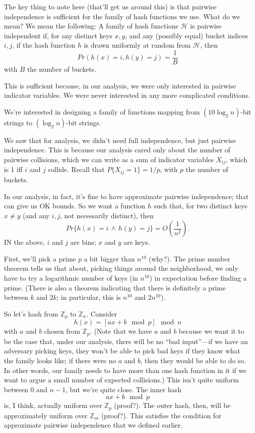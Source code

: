 \documentclass{article}
\newcommand{\Z}{\mathbb{Z}}
\begin{document}
The key thing to note here (that'll get us around this) is that pairwise 
independence is sufficient
for the family of hash functions we use.
What do we mean?
We mean the following:
A family of hash functions $\mathcal H$ is pairwise independent if,
for any distinct keys $x,y$, and any (possibly equal) bucket
indices $i,j$, if the hash function $h$ is drawn uniformly at random
from $\mathcal H$,
then
$$
Pr(h(x) = i, h(y) = j)
=
\frac{1}{B}
$$
with $B$ the number of buckets.

This is sufficient because, in our analysis, we were only interested in
pairwise indicator variables. 
We were never interested in any more complicated conditions.



We're interested in designing a family of functions mapping from
$(10 \log_2 n)$-bit strings to $(\log_2 n)$-bit strings.

We saw that for analysis, we didn't need full independence, but just
pairwise independence.
This is because our analysis cared only about the number of pairwise collisions,
which we can write as a sum of indicator variables $X_{ij}$, which is
1 iff $i$ and $j$ collide.
Recall that $P\{X_{ij} = 1\} = 1/p$, with $p$ the number of buckets.

In our analysis, in fact, it's fine to have approximate pairwise independence;
that can give us OK bounds.
So we want a function $h$ such that, for two distinct keys $x\neq y$ (and any $i,j$, not necessarily distinct),
then
$$
Pr\{
	h(x) = i \,\wedge\,
	h(y) = j
\}
=
O\left(
	\frac{1}{n^2}
\right).
$$
IN the above, $i$ and $j$ are bins; $x$ and $y$ are keys.

First, we'll pick a prime $p$ a bit bigger than $n^{10}$ (why?).
The prime number theorem tells us that about, picking things around the
neighborhood, we only have to try a logarithmic number of keys (in $n^{10}$)
in expectation before finding a prime.
(There is also a theorem indicating that there is definitely a prime
between $k$ and $2k$; in particular, this is $n^{10}$ and $2n^{10}$).

So let's hash from $\Z_p$ to $\Z_n$.
Consider
$$
h(x) = \left[ ax + b \mod p\right]
\mod n
$$
with $a$ and $b$ chosen from $\Z_p$.
(Note that we have $a$ and $b$ because we want it to be the case that,
under our analysis, there will be no ``bad input''---if we have an adversary
picking keys, they won't be able to pick bad keys if they know what the
family looks like; if there were no $a$ and $b$, then they would be
able to do so. In other words, our family needs to have more than one
hash function in it if we want to argue a small number of expected
collisions.)
This isn't quite uniform between $0$ and $n-1$, but we're quite close.
The inner hash
$$
ax + b \mod p
$$
is, I think, actually uniform over $\Z_p$ (proof?).
The outer hash, then, will be approximately uniform over $\Z_m$ (proof?).
This satisfies the condition for approximate pairwise independence
that we defined earlier.
\end{document}
